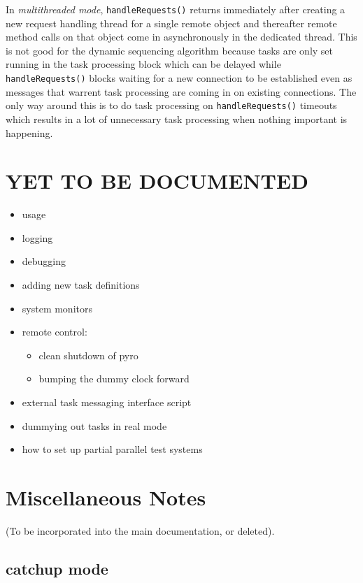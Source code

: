 \documentclass[11pt,a4paper]{article}
\begin{document}
In {\em multithreaded mode}, \verb#handleRequests()# returns immediately
after creating a new request handling thread for a single remote object
and thereafter remote method calls on that object come in asynchronously
in the dedicated thread. This is not good for the dynamic sequencing
algorithm because tasks are only set running in the task processing
block which can be delayed while \verb#handleRequests()# blocks waiting
for a new connection to be established even as messages that warrent
task processing are coming in on existing connections. The only way
around this is to do task processing on \verb#handleRequests()# timeouts
which results in a lot of unnecessary task processing when nothing
important is happening.


\section{YET TO BE DOCUMENTED}

\begin{itemize}
 \item usage
 \item logging
 \item debugging
 \item adding new task definitions
 \item system monitors
 \item remote control: 
    \begin{itemize}
    \item clean shutdown of pyro
    \item bumping the dummy clock forward
    \end{itemize}
 \item external task messaging interface script
 \item dummying out tasks in real mode
 \item how to set up partial parallel test systems
\end{itemize}

\section{Miscellaneous Notes}

(To be incorporated into the main documentation, or deleted).

\subsection{catchup mode}
\end{document}
